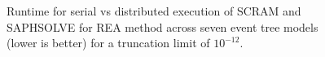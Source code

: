 \begin{figure}[]
  \centering
  
  \caption{Runtime for serial vs distributed execution of SCRAM and SAPHSOLVE for REA method across seven event tree models (lower is better) for a truncation limit of $10^{-12}$.}
  \label{fig:distributed_rea_runtime_1e12}
\end{figure}